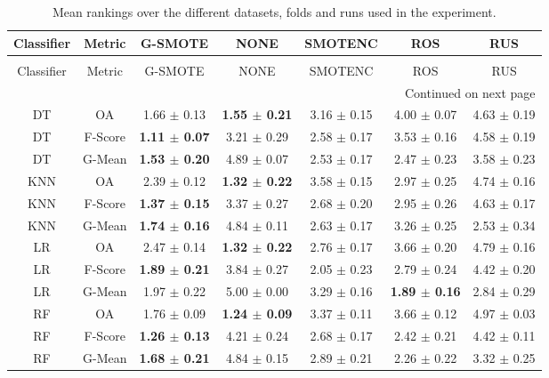 \begin{longtable}{ccccccc}
\caption{Mean rankings over the different datasets, folds and runs used in the experiment.}
\label{tbl:mean_sem_ranks}\\
\toprule
Classifier &  Metric &                  G-SMOTE &                     NONE &         SMOTENC &                      ROS &             RUS \\
\midrule
\endfirsthead
\caption[]{Mean rankings over the different datasets, folds and runs used in the experiment.} \\
\toprule
Classifier &  Metric &                  G-SMOTE &                     NONE &         SMOTENC &                      ROS &             RUS \\
\midrule
\endhead
\midrule
\multicolumn{7}{r}{{Continued on next page}} \\
\midrule
\endfoot

\bottomrule
\endlastfoot
        DT &      OA &          1.66 $\pm$ 0.13 & \textbf{1.55 $\pm$ 0.21} & 3.16 $\pm$ 0.15 &          4.00 $\pm$ 0.07 & 4.63 $\pm$ 0.19 \\
        DT & F-Score & \textbf{1.11 $\pm$ 0.07} &          3.21 $\pm$ 0.29 & 2.58 $\pm$ 0.17 &          3.53 $\pm$ 0.16 & 4.58 $\pm$ 0.19 \\
        DT &  G-Mean & \textbf{1.53 $\pm$ 0.20} &          4.89 $\pm$ 0.07 & 2.53 $\pm$ 0.17 &          2.47 $\pm$ 0.23 & 3.58 $\pm$ 0.23 \\
       KNN &      OA &          2.39 $\pm$ 0.12 & \textbf{1.32 $\pm$ 0.22} & 3.58 $\pm$ 0.15 &          2.97 $\pm$ 0.25 & 4.74 $\pm$ 0.16 \\
       KNN & F-Score & \textbf{1.37 $\pm$ 0.15} &          3.37 $\pm$ 0.27 & 2.68 $\pm$ 0.20 &          2.95 $\pm$ 0.26 & 4.63 $\pm$ 0.17 \\
       KNN &  G-Mean & \textbf{1.74 $\pm$ 0.16} &          4.84 $\pm$ 0.11 & 2.63 $\pm$ 0.17 &          3.26 $\pm$ 0.25 & 2.53 $\pm$ 0.34 \\
        LR &      OA &          2.47 $\pm$ 0.14 & \textbf{1.32 $\pm$ 0.22} & 2.76 $\pm$ 0.17 &          3.66 $\pm$ 0.20 & 4.79 $\pm$ 0.16 \\
        LR & F-Score & \textbf{1.89 $\pm$ 0.21} &          3.84 $\pm$ 0.27 & 2.05 $\pm$ 0.23 &          2.79 $\pm$ 0.24 & 4.42 $\pm$ 0.20 \\
        LR &  G-Mean &          1.97 $\pm$ 0.22 &          5.00 $\pm$ 0.00 & 3.29 $\pm$ 0.16 & \textbf{1.89 $\pm$ 0.16} & 2.84 $\pm$ 0.29 \\
        RF &      OA &          1.76 $\pm$ 0.09 & \textbf{1.24 $\pm$ 0.09} & 3.37 $\pm$ 0.11 &          3.66 $\pm$ 0.12 & 4.97 $\pm$ 0.03 \\
        RF & F-Score & \textbf{1.26 $\pm$ 0.13} &          4.21 $\pm$ 0.24 & 2.68 $\pm$ 0.17 &          2.42 $\pm$ 0.21 & 4.42 $\pm$ 0.11 \\
        RF &  G-Mean & \textbf{1.68 $\pm$ 0.21} &          4.84 $\pm$ 0.15 & 2.89 $\pm$ 0.21 &          2.26 $\pm$ 0.22 & 3.32 $\pm$ 0.25 \\
\end{longtable}
